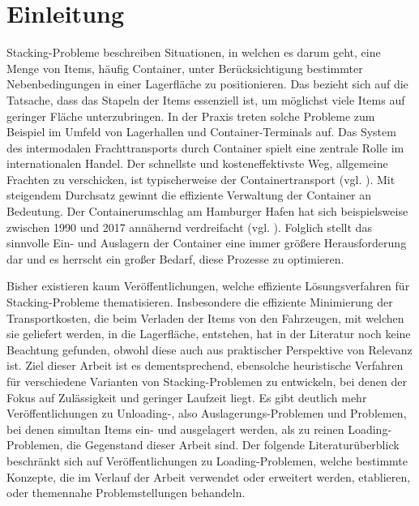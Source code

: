 \section{Einleitung}
\label{sec:einleitung}

Stacking-Probleme beschreiben Situationen, in welchen es darum geht, eine Menge von Items, häufig Container,
unter Berücksichtigung bestimmter Nebenbedingungen in einer Lagerfläche zu positionieren. Das 
bezieht sich auf die Tatsache, dass das Stapeln der Items essenziell ist, um möglichst viele Items
auf geringer Fläche unterzubringen. In der Praxis treten solche Probleme zum Beispiel im Umfeld von Lagerhallen
und Container-Terminals auf.\newline
Das System des intermodalen Frachttransports durch Container spielt eine zentrale Rolle im internationalen Handel.
Der schnellste und kosteneffektivste Weg, allgemeine Frachten zu verschicken, ist typischerweise der
Containertransport (vgl. \citet{Briskorn2018}).
Mit steigendem Durchsatz gewinnt die effiziente Verwaltung der Container an Bedeutung.
Der Containerumschlag am Hamburger Hafen hat sich beispielsweise zwischen 1990 und 2017
annähernd verdreifacht (vgl. \citet{Port_of_Hamburg}).
Folglich stellt das sinnvolle Ein- und Auslagern der Container eine immer größere Herausforderung dar und
es herrscht ein großer Bedarf, diese Prozesse zu optimieren.

Bisher existieren kaum Veröffentlichungen, welche effiziente Lösungsverfahren für Stacking-Probleme thematisieren.
Insbesondere die effiziente Minimierung der Transportkosten, die beim Verladen der Items von den Fahrzeugen,
mit welchen sie geliefert werden, in die Lagerfläche, entstehen, hat in der Literatur noch keine Beachtung gefunden,
obwohl diese auch aus praktischer Perspektive von Relevanz ist. Ziel dieser Arbeit ist es dementsprechend,
ebensolche heuristische Verfahren für verschiedene Varianten von Stacking-Problemen zu entwickeln, bei denen der Fokus auf
Zulässigkeit und geringer Laufzeit liegt.\newline
Es gibt deutlich mehr Veröffentlichungen zu Unloading-, also Auslagerungs-Problemen und Problemen, bei denen simultan Items
ein- und ausgelagert werden, als zu reinen Loading-Problemen, die Gegenstand dieser Arbeit sind.
Der folgende Literaturüberblick beschränkt sich auf Veröffentlichungen zu Loading-Problemen, welche bestimmte Konzepte,
die im Verlauf der Arbeit verwendet oder erweitert werden, etablieren, oder themennahe Problemstellungen behandeln.

